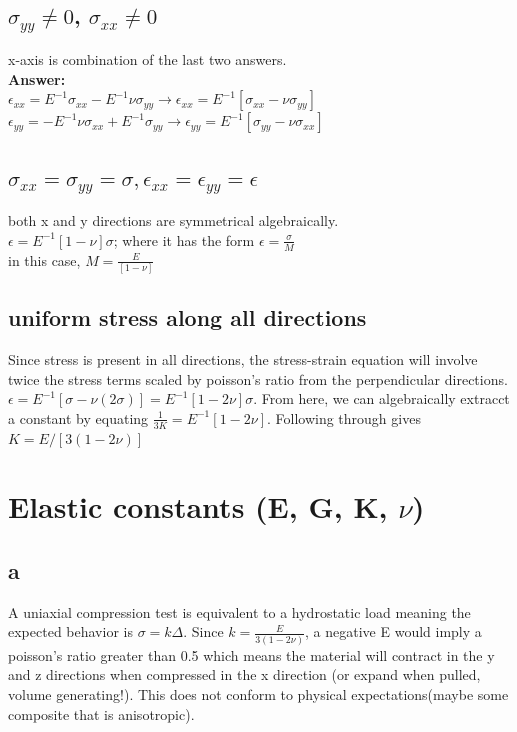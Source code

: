 \documentclass[11pt]{article}
\begin{document}
\subsection{$\sigma_{yy} \neq 0$, $\sigma_{xx} \neq 0$}
x-axis is combination of the last two answers.
\\
\textbf{Answer: 
\\$\epsilon_{xx} = E^{-1}\sigma_{xx}-E^{-1}\nu\sigma_{yy} \rightarrow \epsilon_{xx} = E^{-1}[\sigma_{xx}-\nu\sigma_{yy}]$
\\$\epsilon_{yy} = -E^{-1}\nu\sigma_{xx}+E^{-1}\sigma_{yy} \rightarrow \epsilon_{yy} = E^{-1}[\sigma_{yy}-\nu\sigma_{xx}]$}

\subsection{$\sigma_{xx} = \sigma_{yy} = \sigma, \epsilon_{xx} = \epsilon_{yy} = \epsilon$}
both x and y directions are symmetrical algebraically.
\\
$\epsilon = E^{-1}[1-\nu]\sigma$; where it has the form $\epsilon = \frac{\sigma}{M}$
\\
in this case, $M = \frac{E}{[1-\nu]}$
\subsection{uniform stress along all directions} 
Since stress is present in all directions, the stress-strain equation will involve twice the stress terms scaled by poisson's ratio from the perpendicular directions.
$\epsilon = E^{-1}[\sigma-\nu(2\sigma)]=E^{-1}[1-2\nu]\sigma$. From here, we can algebraically extracct a constant by equating $\frac{1}{3K} = E^{-1}[1-2\nu]$. Following through gives $K = E/[3(1-2\nu)]$
\section{Elastic constants (E, G, K, $\nu$)}
\subsection{a}
A uniaxial compression test is equivalent to a hydrostatic load meaning the expected behavior is $\sigma = k \Delta$. Since $k = \frac{E}{3(1-2\nu)}$, a negative E would imply a poisson's ratio greater than 0.5 which means the material will contract in the y and z directions when compressed in the x direction (or expand when pulled, volume generating!). This does not conform to physical expectations(maybe some composite that is anisotropic).
\end{document}
